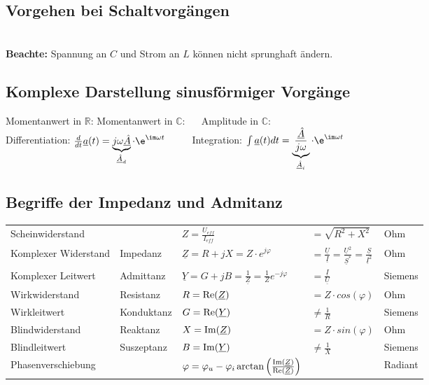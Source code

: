    		\subsection{Vorgehen bei Schaltvorgängen}
   		 $\qquad$\\
   		 \textbf{Beachte:} Spannung an $C$ und Strom an $L$ können nicht sprunghaft ändern.

	\subsection{Komplexe Darstellung sinusförmiger Vorgänge}
		Momentanwert in $\mathbb{R}$:  \quad
		Momentanwert in $\mathbb{C}$:  $\quad$ 
		Amplitude in $\mathbb{C}$: \\
		
		Differentiation: $\frac{d}{dt} \underline{a}(t) = \underbrace{j \omega \underline{\hat{A}}}_{\underline{\hat{A}}_d}\cdot \e^{\im \omega t}$ $\qquad$ 
		Integration: $\int \underline{a}(t) dt = \underbrace{\frac{\underline{\hat{A}}}{j \omega}}_{\underline{\hat{A}}_i}\cdot \e^{\im \omega t}$

	\subsection{Begriffe der Impedanz und Admitanz}
		\begin{tabular}{lllll}
		Scheinwiderstand & & $Z = \frac{U_{eff}}{I_{eff}} $ & $ =
		\sqrt{R^2+X^2}$ & Ohm\\ Komplexer Widerstand & Impedanz & $\underline Z = R + jX = Z \cdot e^{j \varphi}$ 
		& $  = \frac{\underline{U}}{\underline{I}} = \frac{\underline{U}^2}{\underline{S}^*} = 
		\frac{\underline{S}}{\underline{I}^2}$ & Ohm\\
		Komplexer Leitwert & Admittanz & $\underline Y = G + jB =
		\frac{1}{\underline Z} = \frac{1}{Z}e^{-j\varphi}$ & $= \frac{\underline{I}}{\underline{U}}$ &  Siemens\\
		Wirkwiderstand & Resistanz & $R = \operatorname{Re}(\underline Z) $ & $ = Z
		\cdot cos(\varphi)$ & Ohm\\
		Wirkleitwert & Konduktanz & $G = \operatorname{Re}(\underline Y) $ & $ \neq \frac{1}{R}$ &
		Siemens\\
		Blindwiderstand & Reaktanz & $X = \operatorname{Im}(\underline Z) $ & $ = Z
		\cdot sin(\varphi)$ & Ohm\\
		Blindleitwert & Suszeptanz & $B = \operatorname{Im}( \underline Y) $ & $ \neq \frac{1}{X}$
		& Siemens\\
		Phasenverschiebung & & $\varphi = \varphi_u - \varphi_i
		\arctan\left(\frac{\operatorname{Im}(\underline{Z})}{\operatorname{Re}(\underline{Z})}\right)$ & &
		Radiant\\
		
		\end{tabular}
	

